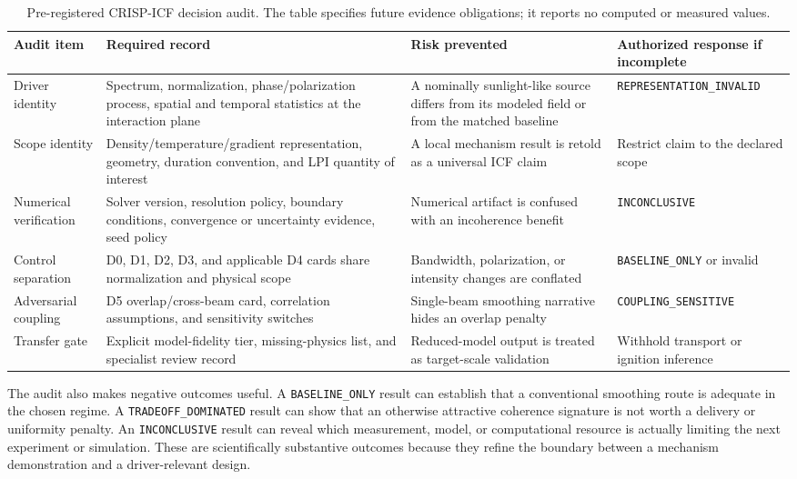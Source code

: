 \documentclass[conference]{../../../../Conference-LaTeX-template_10-17-19/IEEEtran}
\begin{document}
\begin{table}[!t]
\caption{Pre-registered CRISP-ICF decision audit. The table specifies future evidence obligations; it reports no computed or measured values.}
\label{tab:audit}
\centering
\small
\begin{tabularx}{\textwidth}{lYYY}
\toprule
Audit item & Required record & Risk prevented & Authorized response if incomplete \\
\midrule
Driver identity & Spectrum, normalization, phase/polarization process, spatial and temporal statistics at the interaction plane & A nominally sunlight-like source differs from its modeled field or from the matched baseline & \texttt{REPRESENTATION\_INVALID} \\
Scope identity & Density/temperature/gradient representation, geometry, duration convention, and LPI quantity of interest & A local mechanism result is retold as a universal ICF claim & Restrict claim to the declared scope \\
Numerical verification & Solver version, resolution policy, boundary conditions, convergence or uncertainty evidence, seed policy & Numerical artifact is confused with an incoherence benefit & \texttt{INCONCLUSIVE} \\
Control separation & D0, D1, D2, D3, and applicable D4 cards share normalization and physical scope & Bandwidth, polarization, or intensity changes are conflated & \texttt{BASELINE\_ONLY} or invalid \\
Adversarial coupling & D5 overlap/cross-beam card, correlation assumptions, and sensitivity switches & Single-beam smoothing narrative hides an overlap penalty & \texttt{COUPLING\_SENSITIVE} \\
Transfer gate & Explicit model-fidelity tier, missing-physics list, and specialist review record & Reduced-model output is treated as target-scale validation & Withhold transport or ignition inference \\
\bottomrule
\end{tabularx}
\end{table}

The audit also makes negative outcomes useful. A \texttt{BASELINE\_ONLY} result can establish that a conventional smoothing route is adequate in the chosen regime. A \texttt{TRADEOFF\_DOMINATED} result can show that an otherwise attractive coherence signature is not worth a delivery or uniformity penalty. An \texttt{INCONCLUSIVE} result can reveal which measurement, model, or computational resource is actually limiting the next experiment or simulation. These are scientifically substantive outcomes because they refine the boundary between a mechanism demonstration and a driver-relevant design.
\end{document}
